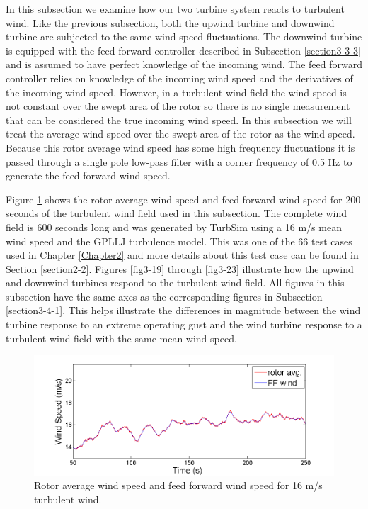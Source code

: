 In this subsection we examine how our two turbine system reacts to turbulent wind. Like the previous subsection, both the upwind turbine and downwind turbine are subjected to the same wind speed fluctuations. The downwind turbine is equipped with the feed forward controller described in Subsection \ref{section3-3-3} and is assumed to have perfect knowledge of the incoming wind. The feed forward controller relies on knowledge of the incoming wind speed and the derivatives of the incoming wind speed. However, in a turbulent wind field the wind speed is not constant over the swept area of the rotor so there is no single measurement that can be considered the true incoming wind speed. In this subsection we will treat the average wind speed over the swept area of the rotor as the wind speed. Because this rotor average wind speed has some high frequency fluctuations it is passed through a single pole low-pass filter with a corner frequency of 0.5 Hz to generate the feed forward wind speed.

Figure \ref{fig3-18} shows the rotor average wind speed and feed forward wind speed for 200 seconds of the turbulent wind field used in this subsection. The complete wind field is 600 seconds long and was generated by TurbSim using a 16 m/s mean wind speed and the GPLLJ turbulence model. This was one of the 66 test cases used in Chapter \ref{Chapter2} and more details about this test case can be found in Section \ref{section2-2}. Figures \ref{fig3-19} through \ref{fig3-23} illustrate how the upwind and downwind turbines respond to the turbulent wind field. All figures in this subsection have the same axes as the corresponding figures in Subsection \ref{section3-4-1}. This helps illustrate the differences in magnitude between the wind turbine response to an extreme operating gust and the wind turbine response to a turbulent wind field with the same mean wind speed.

\begin{figure}[htbp]
	\centering
		\includegraphics[width = \linewidth]{Figures/ch3Figures/fig3-18.png}
		
	\caption{Rotor average wind speed and feed forward wind speed for 16 m/s turbulent wind.}
	\label{fig3-18}
\end{figure}


